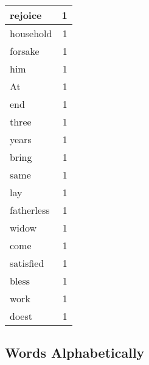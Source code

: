 \begin{center}
\begin{longtable}{l|r}
rejoice & 1 \\ \hline
household & 1 \\ \hline
forsake & 1 \\ \hline
him & 1 \\ \hline
At & 1 \\ \hline
end & 1 \\ \hline
three & 1 \\ \hline
years & 1 \\ \hline
bring & 1 \\ \hline
same & 1 \\ \hline
lay & 1 \\ \hline
fatherless & 1 \\ \hline
widow & 1 \\ \hline
come & 1 \\ \hline
satisfied & 1 \\ \hline
bless & 1 \\ \hline
work & 1 \\ \hline
doest & 1 \\ \hline
\end{longtable}
\end{center}



\normalsize



\subsection{Words Alphabetically}

